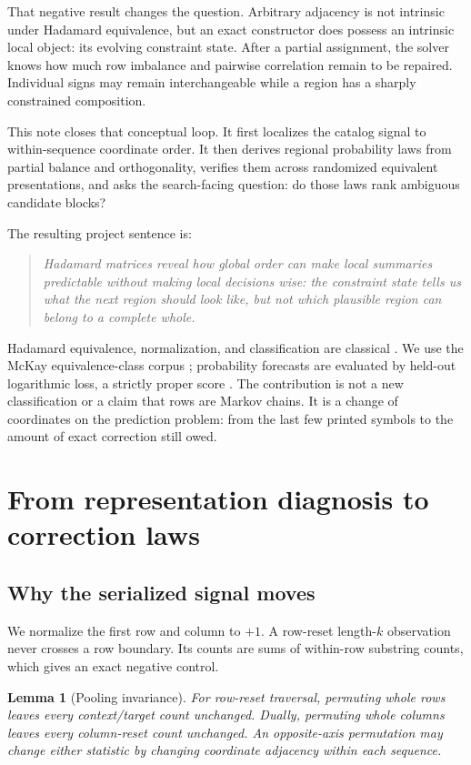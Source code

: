 \documentclass[10pt,twoside]{article}
\theoremstyle{noteplain}
\newtheorem{lemma}[theorem]{Lemma}
\theoremstyle{definition}
\begin{document}
That negative result changes the question.  Arbitrary adjacency is not intrinsic under Hadamard equivalence, but an exact constructor does possess an intrinsic local object: its evolving constraint state.  After a partial assignment, the solver knows how much row imbalance and pairwise correlation remain to be repaired.  Individual signs may remain interchangeable while a region has a sharply constrained composition.

This note closes that conceptual loop.  It first localizes the catalog signal to within-sequence coordinate order.  It then derives regional probability laws from partial balance and orthogonality, verifies them across randomized equivalent presentations, and asks the search-facing question: do those laws rank ambiguous candidate blocks?

The resulting project sentence is:
\begin{quote}
\centering\itshape
Hadamard matrices reveal how global order can make local summaries predictable without making local decisions wise: the constraint state tells us what the next region should look like, but not which plausible region can belong to a complete whole.
\end{quote}

Hadamard equivalence, normalization, and classification are classical \citep{horadam2007,spence1995}.  We use the McKay equivalence-class corpus \citep{mckaydata}; probability forecasts are evaluated by held-out logarithmic loss, a strictly proper score \citep{gneitingraftery2007}.  The contribution is not a new classification or a claim that rows are Markov chains.  It is a change of coordinates on the prediction problem: from the last few printed symbols to the amount of exact correction still owed.

\section{From representation diagnosis to correction laws}

\subsection{Why the serialized signal moves}

We normalize the first row and column to $+1$.  A row-reset length-$k$ observation never crosses a row boundary.  Its counts are sums of within-row substring counts, which gives an exact negative control.

\begin{lemma}[Pooling invariance]\label{lem:pooling}
For row-reset traversal, permuting whole rows leaves every context/target count unchanged.  Dually, permuting whole columns leaves every column-reset count unchanged.  An opposite-axis permutation may change either statistic by changing coordinate adjacency within each sequence.
\end{lemma}
\end{document}
